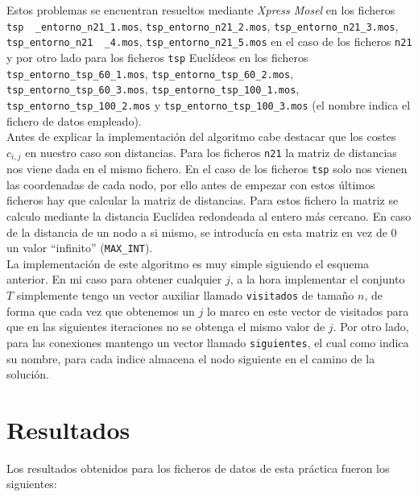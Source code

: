 \documentclass[a4paper,11pt]{article}
\begin{document}
Estos problemas se encuentran resueltos mediante \textit{Xpress Mosel} en los ficheros \texttt{tsp \ \_entorno\_n21\_1.mos}, \texttt{tsp\_entorno\_n21\_2.mos}, \texttt{tsp\_entorno\_n21\_3.mos}, \texttt{tsp\_entorno\_n21 \ \_4.mos}, \texttt{tsp\_entorno\_n21\_5.mos} en el caso de los ficheros \texttt{n21} y por otro lado para los ficheros \texttt{tsp} Euclídeos en los ficheros \texttt{tsp\_entorno\_tsp\_60\_1.mos}, \texttt{tsp\_entorno\_tsp\_60\_2.mos}, \texttt{tsp\_entorno\_tsp\_60\_3.mos}, \texttt{tsp\_entorno\_tsp\_100\_1.mos}, \texttt{tsp\_entorno\_tsp\_100\_2.mos} y \texttt{tsp\_entorno\_tsp\_100\_3.mos} (el nombre indica el fichero de datos empleado).\\

Antes de explicar la implementación del algoritmo cabe destacar que los costes ${c_{i,j}}$ en nuestro caso son distancias. Para los ficheros \texttt{n21} la matriz de distancias nos viene dada en el mismo fichero. En el caso de los ficheros \texttt{tsp} solo nos vienen las coordenadas de cada nodo, por ello antes de empezar con estos últimos ficheros hay que calcular la matriz de distancias. Para estos fichero la matriz se calculo mediante la distancia Euclídea redondeada al entero más cercano. En caso de la distancia de un nodo a si mismo, se introducía en esta matriz en vez de 0 un valor ``infinito'' (\texttt{MAX\_INT}).\\

La implementación de este algoritmo es muy simple siguiendo el esquema anterior. En mi caso para obtener cualquier ${j}$, a la hora implementar el conjunto ${T}$ simplemente tengo un vector auxiliar llamado \texttt{visitados} de tamaño ${n}$, de forma que cada vez que obtenemos un ${j}$ lo marco en este vector de visitados para que en las siguientes iteraciones no se obtenga el mismo valor de ${j}$. Por otro lado, para las conexiones mantengo un vector llamado \texttt{siguientes}, el cual como indica su nombre, para cada indice almacena el nodo siguiente en el camino de la solución.

\section{Resultados}
Los resultados obtenidos para los ficheros de datos de esta práctica fueron los siguientes:
\end{document}
